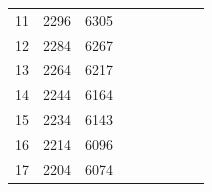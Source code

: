 \documentclass[a4paper, 12pt]{article}%
\begin{document}
\begin{table}[H]
\begin{center}
{\begin{tabular}{|rrr|rrrrrr}
					\multicolumn{1}{|r|}{11}    & \multicolumn{1}{r|}{2296}            & 6305                                                 &                      &                      &                       &                            &                                      &                                                      \\ \cline{1-3}
					\multicolumn{1}{|r|}{12}    & \multicolumn{1}{r|}{2284}            & 6267                                                 &                      &                      &                       &                            &                                      &                                                      \\ \cline{1-3}
					\multicolumn{1}{|r|}{13}    & \multicolumn{1}{r|}{2264}            & 6217                                                 &                      &                      &                       &                            &                                      &                                                      \\ \cline{1-3}
					\multicolumn{1}{|r|}{14}    & \multicolumn{1}{r|}{2244}            & 6164                                                 &                      &                      &                       &                            &                                      &                                                      \\ \cline{1-3}
					\multicolumn{1}{|r|}{15}    & \multicolumn{1}{r|}{2234}            & 6143                                                 &                      &                      &                       &                            &                                      &                                                      \\ \cline{1-3}
					\multicolumn{1}{|r|}{16}    & \multicolumn{1}{r|}{2214}            & 6096                                                 &                      &                      &                       &                            &                                      &                                                      \\ \cline{1-3}
					\multicolumn{1}{|r|}{17}    & \multicolumn{1}{r|}{2204}            & 6074                                                 &                      &                      &                       &                            &                                      &                                                      \\ \cline{1-3}

\end{tabular}}
\end{center}
\end{table}
\end{document}
